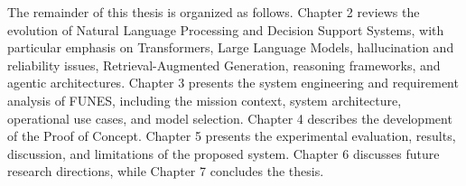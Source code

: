 The remainder of this thesis is organized as follows. Chapter 2 reviews the evolution of Natural Language Processing and Decision Support Systems, with particular emphasis on Transformers, Large Language Models, hallucination and reliability issues, Retrieval-Augmented Generation, reasoning frameworks, and agentic architectures. Chapter 3 presents the system engineering and requirement analysis of FUNES, including the mission context, system architecture, operational use cases, and model selection. Chapter 4 describes the development of the Proof of Concept. Chapter 5 presents the experimental evaluation, results, discussion, and limitations of the proposed system. Chapter 6 discusses future research directions, while Chapter 7 concludes the thesis.

